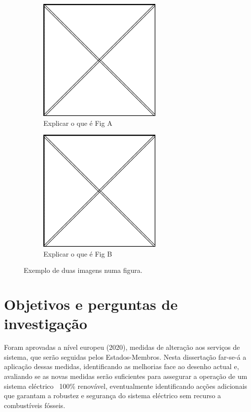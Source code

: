 \begin{figure}[H]
\centering
\begin{subfigure}{.5\textwidth}
  \centering
  \includegraphics[width=.6\linewidth]{Imagens/FigA.png}
  \caption{Explicar o que é Fig A}
  \label{fig:sub1}
\end{subfigure}%
\begin{subfigure}{.5\textwidth}
  \centering
  \includegraphics[width=.6\linewidth]{Imagens/FigB.png}
  \caption{Explicar o que é Fig B}
  \label{fig:sub2}
\end{subfigure}
\caption{Exemplo de duas imagens numa figura.}
\label{fig:test}
\end{figure}


\section{Objetivos e perguntas de investigação \label{se:objetivos}}

Foram aprovadas a nível europeu (2020), medidas de alteração aos serviços de sistema, que serão seguidas pelos Estados-Membros. Nesta dissertação far-se-á a aplicação dessas medidas, identificando as melhorias face ao desenho actual e, avaliando se as novas medidas serão suficientes para assegurar a operação de um sistema eléctrico ~100\% renovável, eventualmente identificando acções adicionais que garantam a robustez e segurança do sistema eléctrico sem recurso a combustíveis fósseis.

